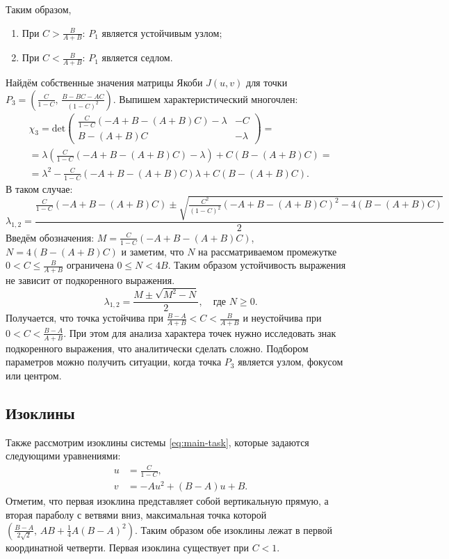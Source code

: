 \documentclass[a4paper, 11pt]{article}
\begin{document}
	Таким образом,
	\begin{enumerate}
			\item При $C > \frac{B}{A+B}$: $P_1$ является устойчивым узлом;
			\item При $C < \frac{B}{A+B}$: $P_1$ является седлом.
	\end{enumerate}

	Найдём собственные значения матрицы Якоби $J(u,v)$ для точки $P_3=\left(\frac{C}{1 - C},\, \frac{B - BC - AC}{(1 - C)^2}\right)$. Выпишем характеристический многочлен:
	\begin{multline*}
			\chi_3 = \mathrm{det}\begin{pmatrix}
					\frac{C}{1-C}(-A + B - (A+B) C) - \lambda
					&
					-C
					\\
					B - (A+B)C
					&
					-\lambda
			\end{pmatrix}
			=\\=
			\lambda\left(\frac{C}{1-C}(-A + B - (A+B)C) - \lambda\right) + C(B - (A+B)C) 
			=\\=
			\lambda^2 - \frac{C}{1-C}(-A + B - (A + B)C)\lambda + C(B - (A+B)C).
	\end{multline*}
	В таком случае:
	$$
		\lambda_{1,2} = \frac{\frac{C}{1-C}(-A + B - (A+B)C) \pm \sqrt{\frac{C^2}{(1-C)^2}(-A+B-(A+B)C)^2 - 4(B-(A+B)C)}}{2}
	$$
	Введём обозначения: $M = \frac{C}{1-C}(-A + B - (A+B)C)$, $N = 4(B-(A+B)C)$ и заметим, что $N$ на рассматриваемом промежутке $0 < C \leqslant \frac{B}{A+B}$ ограничена $0 \leqslant N < 4B$. Таким образом устойчивость выражения не зависит от подкоренного выражения.
	$$
			\lambda_{1,2} = \frac{M \pm \sqrt{M^2 - N}}{2}, \quad \mbox{где } N\geqslant0.
	$$
	Получается, что точка устойчива при $\frac{B-A}{A+B} < C < \frac{B}{A+B}$ и неустойчива при $0 < C < \frac{B-A}{A+B}$. При этом для анализа характера точек нужно исследовать знак подкоренного выражения, что аналитически сделать сложно. Подбором параметров можно получить ситуации, когда точка $P_3$ является узлом, фокусом или центром.


	\subsection{Изоклины}

	Также рассмотрим изоклины системы \eqref{eq:main-task}, которые задаются следующими уравнениями:
	\begin{equation}
		\begin{aligned}
			u &= \frac{C}{1-C},\\
			v &= -Au^2 + (B - A)u + B.
		\end{aligned}
	\end{equation}
	Отметим, что первая изоклина представляет собой вертикальную прямую, а вторая параболу с ветвями вниз, максимальная точка которой $\left(\frac{B-A}{2\sqrt{2}},\,AB+\frac{1}{4}A(B-A)^2\right)$. Таким образом обе изоклины лежат в первой координатной четверти. Первая изоклина существует при $C < 1$.
\end{document}
